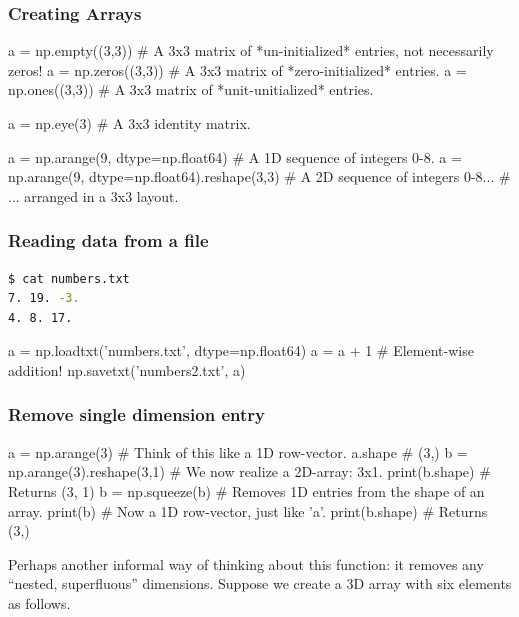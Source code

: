 \documentclass[12pt,letterpaper,twoside]{article}
\begin{document}
\subsubsection{Creating Arrays}

\begin{python}
a = np.empty((3,3))   # A 3x3 matrix of *un-initialized* entries, not necessarily zeros!
a = np.zeros((3,3))   # A 3x3 matrix of *zero-initialized* entries.
a = np.ones((3,3))    # A 3x3 matrix of *unit-unitialized* entries.

a = np.eye(3)         # A 3x3 identity matrix.

a = np.arange(9, dtype=np.float64)               # A 1D sequence of integers 0-8.
a = np.arange(9, dtype=np.float64).reshape(3,3)  # A 2D sequence of integers 0-8...
                                                 # ... arranged in a 3x3 layout.
\end{python}

\subsubsection{Reading data from a file}

\begin{lstlisting}[language=bash]
$ cat numbers.txt
7. 19. -3.
4. 8. 17.
\end{lstlisting}

\begin{python}
a = np.loadtxt('numbers.txt', dtype=np.float64)
a = a + 1      # Element-wise addition!
np.savetxt('numbers2.txt', a)
\end{python}

\subsubsection{Remove single dimension entry}

\begin{python}
a = np.arange(3)   # Think of this like a 1D row-vector.
a.shape            # (3,)
b = np.arange(3).reshape(3,1)  # We now realize a 2D-array: 3x1.
print(b.shape)                 # Returns (3, 1)
b = np.squeeze(b)              # Removes 1D entries from the shape of an array.
print(b)                       # Now a 1D row-vector, just like 'a'.
print(b.shape)                 # Returns (3,)
\end{python}

Perhaps another informal way of thinking about this function: it removes any
``nested, superfluous'' dimensions.  Suppose we create a 3D array with
six elements as follows.
\end{document}
